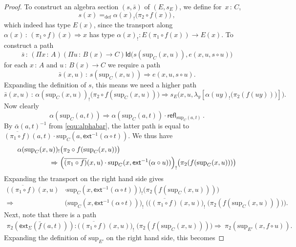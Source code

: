 \documentclass[10pt,a4paper,oneside,reqno]{amsart}
\numberwithin{equation}{section}
\theoremstyle{mythm}
\theoremstyle{mydef}
\theoremstyle{myrmk}
\newcommand{\defeq}{=_{\mathrm{def}}}
\newcommand{\co}{\,{:}\,}
\newcommand{\com}{\circ}
\newcommand{\ct}{\cdot}
\newcommand{\ext}{\mathsf{ext}}
\newcommand{\Id}{\mathsf{Id}}
\newcommand{\refl}{\mathsf{refl}}
\newcommand{\lam}[1]{\lambda_{#1}}
\renewcommand{\sup}{\mathrm{sup}}
\begin{document}
\begin{proof}
To construct an algebra section $(s, \bar{s})$ of $(E, s_E)$, we define for~$x \co C$, 
\begin{equation}
\label{equ:defreqsection}
s(x) \defeq \alpha(x)_{!} \big( \pi_2 \com f (x) \big) \, ,
\end{equation}
which indeed has type $E(x)$, since the transport along $\alpha(x) \co (\pi_1 \circ f)(x) \Rightarrow x$ has type $\alpha(x)_{!} : E(\pi_1 \com f (x)) \to E(x)$.
%
To construct a path 
\[
\bar{s} \co (\Pi x  \co A) (\Pi u  \co B(x) \to C) \Id \big( s(\sup_C(x,u)), e(x, u, s \circ u) \big)
\]
for each $x \co A$ and $u \co B(x)\to C$ we require a path
\[
\bar{s}(x,u) \co s(\sup_C(x,u)) \Rightarrow e(x, u, s \circ u).
\] 
Expanding the definition of $s$, this means we need a higher path
\begin{equation}\label{eq:proof:thm:WMain:needpath}
\bar{s}(x,u) \co \alpha(\sup_C(x,u))_{!} \big( \pi_2 \com f (\sup_C(x,u)) \big) \Rightarrow 
s_E\big(x, u, \lam{y}[\alpha(u y)_{!} \big( \pi_2 (f(u y))\big)]\big).
\end{equation}
Now clearly 
\[
\alpha(\sup_C(a,t)) \Rightarrow \alpha(\sup_C(a,t)) \ct \refl_{\sup_C(a,t)} \, .
\]
By $\bar{\alpha}(a,t)^{-1}$ from \eqref{equ:alphabar}, the latter path is equal to $\overline{(\pi_1 \com f)}(a,t) \ct \sup_C(a,\ext^{-1}(\alpha \circ t))$. 
We thus have
\begin{align}
\alpha(\sup_C(x,u))_{!}& \big( \pi_2 \com f (\sup_C(x,u)) \big) \notag \\
 \Rightarrow\ &
 \Big(\overline{(\pi_1 \com f)}(x,u) \ct \sup_C(x,\ext^{-1}(\alpha \circ u))\Big)_{!} \big( \pi_2 (f (\sup_C(x,u))) \big) \label{eqnstart}
\end{align}
Expanding the transport on the right hand side gives
\begin{align*}
\Big(\overline{(\pi_1 \com f)}(x,u)& \ct \sup_C(x,\ext^{-1}(\alpha \circ t))\Big)_{!} \big( \pi_2 (f (\sup_C(x,u))) \big) \\
\Rightarrow &\big(\sup_C(x,\ext^{-1}(\alpha \circ t))\big)_{!} \; \Big( \big(\overline{(\pi_1 \com f)}(x,u)\big)_{!} \; 
\big(\pi_2 (f (\sup_C(x,u))) \big) \Big).
\end{align*}
%
Next, note that there is a path 
\begin{align*}
\pi_2(\ext_\Sigma(\bar{f}(a,t))) : \big(\overline{(\pi_1 \com f)}(x,u)\big)_{!} \; \big(\pi_2(f (\sup_C(x,u))) \big)
\Rightarrow\ \pi_2(\sup_{E'}(x, f \circ u)).
\end{align*}
Expanding the definition of $\sup_{E'}$ on the right hand side, this becomes

\end{proof}
\end{document}
